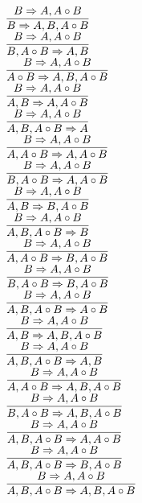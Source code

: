 \documentclass[11pt]{article}
\begin{document}
\begin{center}
\bigskip
\\$\infer{B\Rightarrow A, B, A\circ B}{B\Rightarrow A, A\circ B}$
\bigskip
\\$\infer{B, A\circ B\Rightarrow A, B}{B\Rightarrow A, A\circ B}$
\bigskip
\\$\infer{A\circ B\Rightarrow A, B, A\circ B}{B\Rightarrow A, A\circ B}$
\bigskip
\\$\infer{A, B\Rightarrow A, A\circ B}{B\Rightarrow A, A\circ B}$
\bigskip
\\$\infer{A, B, A\circ B\Rightarrow A}{B\Rightarrow A, A\circ B}$
\bigskip
\\$\infer{A, A\circ B\Rightarrow A, A\circ B}{B\Rightarrow A, A\circ B}$
\bigskip
\\$\infer{B, A\circ B\Rightarrow A, A\circ B}{B\Rightarrow A, A\circ B}$
\bigskip
\\$\infer{A, B\Rightarrow B, A\circ B}{B\Rightarrow A, A\circ B}$
\bigskip
\\$\infer{A, B, A\circ B\Rightarrow B}{B\Rightarrow A, A\circ B}$
\bigskip
\\$\infer{A, A\circ B\Rightarrow B, A\circ B}{B\Rightarrow A, A\circ B}$
\bigskip
\\$\infer{B, A\circ B\Rightarrow B, A\circ B}{B\Rightarrow A, A\circ B}$
\bigskip
\\$\infer{A, B, A\circ B\Rightarrow A\circ B}{B\Rightarrow A, A\circ B}$
\bigskip
\\$\infer{A, B\Rightarrow A, B, A\circ B}{B\Rightarrow A, A\circ B}$
\bigskip
\\$\infer{A, B, A\circ B\Rightarrow A, B}{B\Rightarrow A, A\circ B}$
\bigskip
\\$\infer{A, A\circ B\Rightarrow A, B, A\circ B}{B\Rightarrow A, A\circ B}$
\bigskip
\\$\infer{B, A\circ B\Rightarrow A, B, A\circ B}{B\Rightarrow A, A\circ B}$
\bigskip
\\$\infer{A, B, A\circ B\Rightarrow A, A\circ B}{B\Rightarrow A, A\circ B}$
\bigskip
\\$\infer{A, B, A\circ B\Rightarrow B, A\circ B}{B\Rightarrow A, A\circ B}$
\bigskip
\\$\infer{A, B, A\circ B\Rightarrow A, B, A\circ B}{B\Rightarrow A, A\circ B}$
\bigskip
\\
\end{center}
\end{document}
